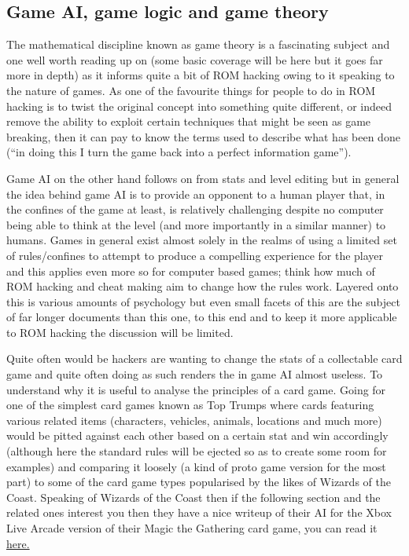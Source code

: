 \documentclass[
]{book}
\begin{document}
\hypertarget{game-ai-game-logic-and-game-theory}{%
\subsection{Game AI, game logic and game theory}\label{game-ai-game-logic-and-game-theory}}

The mathematical discipline known as game theory is a fascinating subject and one well worth reading up on (some basic coverage will be here but it goes far more in depth) as it informs quite a bit of ROM hacking owing to it speaking to the nature of games. As one of the favourite things for people to do in ROM hacking is to twist the original concept into something quite different, or indeed remove the ability to exploit certain techniques that might be seen as game breaking, then it can pay to know the terms used to describe what has been done (``in doing this I turn the game back into a perfect information game'').

Game AI on the other hand follows on from stats and level editing but in general the idea behind game AI is to provide an opponent to a human player that, in the confines of the game at least, is relatively challenging despite no computer being able to think at the level (and more importantly in a similar manner) to humans. Games in general exist almost solely in the realms of using a limited set of rules/confines to attempt to produce a compelling experience for the player and this applies even more so for computer based games; think how much of ROM hacking and cheat making aim to change how the rules work. Layered onto this is various amounts of psychology but even small facets of this are the subject of far longer documents than this one, to this end and to keep it more applicable to ROM hacking the discussion will be limited.

Quite often would be hackers are wanting to change the stats of a collectable card game and quite often doing as such renders the in game AI almost useless. To understand why it is useful to analyse the principles of a card game. Going for one of the simplest card games known as Top Trumps where cards featuring various related items (characters, vehicles, animals, locations and much more) would be pitted against each other based on a certain stat and win accordingly (although here the standard rules will be ejected so as to create some room for examples) and comparing it loosely (a kind of proto game version for the most part) to some of the card game types popularised by the likes of Wizards of the Coast. Speaking of Wizards of the Coast then if the following section and the related ones interest you then they have a nice writeup of their AI for the Xbox Live Arcade version of their Magic the Gathering card game, you can read it \href{http://archive.wizards.com/Magic/Magazine/Article.aspx?x=mtg/daily/feature/44}{here.}
\end{document}
